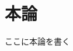 \documentclass[main]{subfiles}
\begin{document}
\chapter{本論}
ここに本論を書く\cite{ref:yao2017integrated}\cite{ref:ugarte1992curling} \cite{ref:nomura2022uwb}
\end{document}
